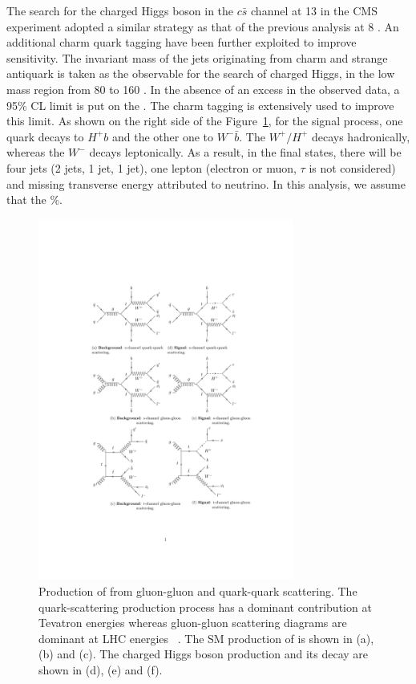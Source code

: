  
The search for the charged Higgs boson in the $c\bar{s}$ channel at 13 
\TeV in the CMS experiment adopted a similar strategy as that of the 
previous analysis at 8 \TeV \cite{Khachatryan:2015uua}. An additional 
charm quark tagging have been further exploited to improve sensitivity. 
The invariant mass of the jets originating from charm and strange 
antiquark is taken as the observable for the search of charged Higgs, 
in the low mass region from 80 to 160 \GeV. In the absence of an 
excess in the observed data, a 95\% CL limit is put on the \brThb. The 
charm tagging is extensively used to improve this limit. As shown on 
the right side of the Figure~\ref{fig:feyn_diag_sig}, for the signal 
process, one \PQt quark decays to $H^+ b$ and the other one to 
$W^- \bar{b}$. The $W^+/H^+$ decays hadronically, whereas the $W^-$ 
decays leptonically. As a result, in the final states, there will be 
four jets (2 \PQb jets, 1 \PQc jet, 1 \PQs jet), one lepton (electron 
or muon, $\tau$ is not considered) and missing transverse energy 
attributed to neutrino. In this analysis, we assume that the \%.
\begin{figure}
\centering
\includegraphics[width=0.75\textwidth]{Image/FeynDiag/feyn_diag_sig.pdf}
\caption{Production of \ttbar from gluon-gluon and quark-quark scattering. 
         The quark-scattering production process has a dominant contribution at 
         Tevatron energies whereas gluon-gluon scattering diagrams are dominant 
         at LHC energies ~\cite{Gerber:2014xea, Fiorini:2012fe}. The SM production
         of \ttbar is shown in (a), (b) and (c). The charged Higgs boson 
         production and its decay are shown in (d), (e) and (f).}
\label{fig:feyn_diag_sig}
\end{figure}

